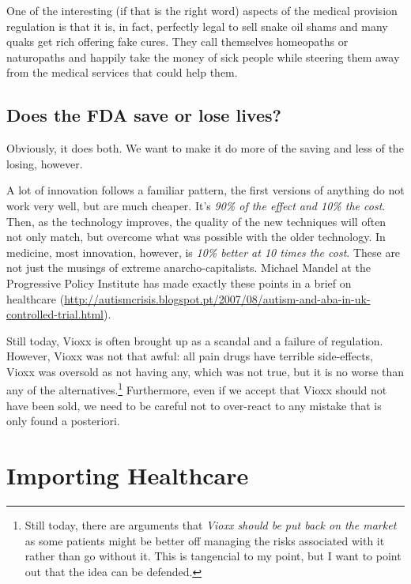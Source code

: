 One of the interesting (if that is the right word) aspects of the medical
provision regulation is that it is, in fact, perfectly legal to sell snake oil
shams and many quaks get rich offering fake cures. They call themselves
homeopaths or naturopaths and happily take the money of sick people while
steering them away from the medical services that could help them.

\subsection{Does the FDA save or lose lives?}

Obviously, it does both. We want to make it do more of the saving and less of
the losing, however.

A lot of innovation follows a familiar pattern, the first versions of anything
do not work very well, but are much cheaper. It's \emph{90\% of the effect and
10\% the cost}. Then, as the technology improves, the quality of the new
techniques will often not only match, but overcome what was possible with the
older technology. In medicine, most innovation, however, is \emph{10\% better
at 10 times the cost}. These are not just the musings of extreme
anarcho-capitalists. Michael Mandel at the Progressive Policy Institute has
made exactly these points in a brief on healthcare
(\url{http://autismcrisis.blogspot.pt/2007/08/autism-and-aba-in-uk-controlled-trial.html}).

Still today, Vioxx is often brought up as a scandal and a failure of
regulation. However, Vioxx was not that awful: all pain drugs have terrible
side-effects, Vioxx was oversold as not having any, which was not true, but it
is no worse than any of the alternatives.\footnote{Still today, there are
arguments that \emph{Vioxx should be put back on the market} as some patients
might be better off managing the risks associated with it rather than go
without it. This is tangencial to my point, but I want to point out that the
idea can be defended.} Furthermore, even if we accept that Vioxx should not
have been sold, we need to be careful not to over-react to any mistake that is
only found a posteriori.

\section{Importing Healthcare}

